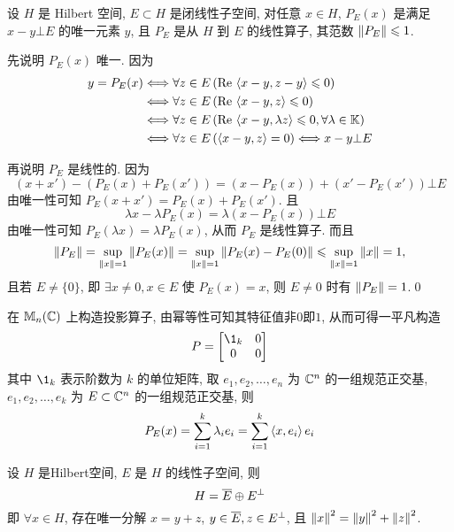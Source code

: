 		\begin{Theorem}[投影线性算子]
			 设 $ H $ 是 Hilbert 空间, $ E\subset H $ 是闭线性子空间,  对任意 $ x\in H $, $ P_{E}(x) $ 是满足 $ x- y\bot E $ 的唯一元素 $ y $, 且 $ P_{E} $ 是从 $ H $ 到 $ E $ 的线性算子, 其范数 $ \norm{P_{E}}\leqslant1 $.
		\end{Theorem}
			
		\begin{Proof}
			先说明 $ P_{E}(x) $ 唯一. 因为
			\[
				\begin{aligned}
					y=P_{E}(x) & \Longleftrightarrow \forall z\in E\,(\Re\lrangle{x-y, z-y}\leqslant0)\\
					& \Longleftrightarrow \forall z\in E\,(\Re\lrangle{x-y, z}\leqslant0)\\
					& \Longleftrightarrow \forall z\in E\,(\Re\lrangle{x-y, \lambda z}\leqslant0, \forall \lambda\in \K)\\
					& \Longleftrightarrow \forall z\in E\,(\lrangle{x-y, z}=0)\Longleftrightarrow x-y\bot E
				\end{aligned}
			\]

			再说明 $ P_{E} $ 是线性的. 因为
			\[
				(x+x')-(P_{E}(x)+P_{E}(x'))=(x-P_{E}(x))+(x'-P_{E}(x'))\bot E
			\]
			由唯一性可知 $ P_{E}(x+x')=P_{E}(x)+P_{E}(x') $. 且
			\[
				\lambda x-\lambda P_{E}(x)=\lambda(x-P_{E}(x))\bot E
			\]
			由唯一性可知 $ P_{E}(\lambda x)=\lambda P_{E}(x) $, 从而 $ P_{E} $ 是线性算子. 而且
			\[
				\norm{P_{E}}=\sup_{\norm{x}=1}\norm{P_{E}(x)}=\sup_{\norm{x}=1}\norm{P_{E}(x)-P_{E}(0)}\leqslant\sup_{\norm{x}=1}\norm{x}=1,
			\]
			且若 $ E\ne \{ 0 \} $, 即 $ \exists x\ne 0, x\in E $ 使 $ P_{E}(x)=x $, 则 $ E\ne 0 $ 时有 $ \norm{P_{E}}=1 $.\qed
		\end{Proof}
		 
		\begin{Example}
			在 $ \mathbb{M}_{n}(\C) $ 上构造投影算子, 由幂等性可知其特征值非$0$即$1$, 从而可得一平凡构造
			\[
				P=\begin{bmatrix}
					\1_{k} & 0 \\
					0 & 0
				\end{bmatrix}
			\]
			其中 $ \1_{k} $ 表示阶数为 $ k $ 的单位矩阵, 取 $ e_{1}, e_{2},\dots,e_{n} $ 为 $ \C^{n} $ 的一组规范正交基, $ e_{1}, e_{2},\dots,e_{k} $ 为 $ E\subset\C^{n} $ 的一组规范正交基, 则
			\[
				P_{E}(x)=\sum_{i=1}^{k}\lambda_{i}e_{i}=\sum_{i=1}^{k}\lrangle{x, e_{i}}e_{i}
			\]
		\end{Example}

	\begin{Corollary}[正交分解]
		设 $ H $ 是Hilbert空间, $ E $ 是 $ H $ 的线性子空间, 则
		\[
			H=\baro{E}\oplus E^{\bot}
		\]
		即 $ \forall x\in H $, 存在唯一分解 $ x=y+z $, $ y\in\baro{E}, z\in E^{\bot} $, 且 $ \norm{x}^{2}=\norm{y}^{2}+\norm{z}^{2} $.
	\end{Corollary}

